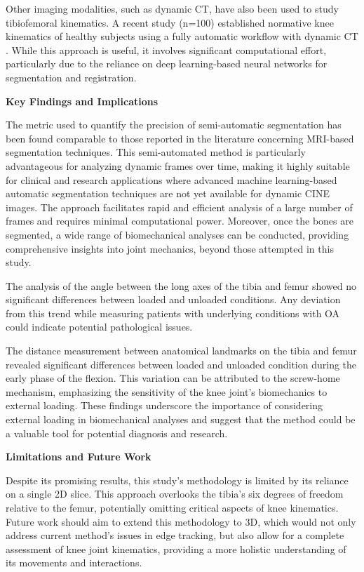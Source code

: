 \documentclass{micro-econ-thesis}
\begin{document}
Other imaging modalities, such as dynamic CT, have also been used to study tibiofemoral kinematics. A recent study (n=100) established normative knee kinematics of healthy subjects using a fully automatic workflow with dynamic CT \parencite{dunning_fully_2023}. While this approach is useful, it involves significant computational effort, particularly due to the reliance on deep learning-based neural networks for segmentation and registration. 

\textbf{Key Findings and Implications}

The metric used to quantify the precision of semi-automatic segmentation has been found comparable to those reported in the literature concerning MRI-based segmentation techniques. This semi-automated method is particularly advantageous for analyzing dynamic frames over time, making it highly suitable for clinical and research applications where advanced machine learning-based automatic segmentation techniques are not yet available for dynamic CINE images. The approach facilitates rapid and efficient analysis of a large number of frames and requires minimal computational power. Moreover, once the bones are segmented, a wide range of biomechanical analyses can be conducted, providing comprehensive insights into joint mechanics, beyond those attempted in this study.

The analysis of the angle between the long axes of the tibia and femur showed no significant differences between loaded and unloaded conditions. Any deviation from this trend while measuring patients with underlying conditions with OA could indicate potential pathological issues.

The distance measurement between anatomical landmarks on the tibia and femur revealed significant differences between loaded and unloaded condition during the early phase of the flexion. This variation can be attributed to the screw-home mechanism, emphasizing the sensitivity of the knee joint's biomechanics to external loading. These findings underscore the importance of considering external loading in biomechanical analyses and suggest that the method could be a valuable tool for potential diagnosis and research.



\textbf{Limitations and Future Work}

Despite its promising results, this study's methodology is limited by its reliance on a single 2D slice. This approach overlooks the tibia's six degrees of freedom relative to the femur, potentially omitting critical aspects of knee kinematics. Future work should aim to extend this methodology to 3D, which would not only address current method's issues in edge tracking, but also allow for a complete assessment of knee joint kinematics, providing a more holistic understanding of its movements and interactions.
\end{document}
